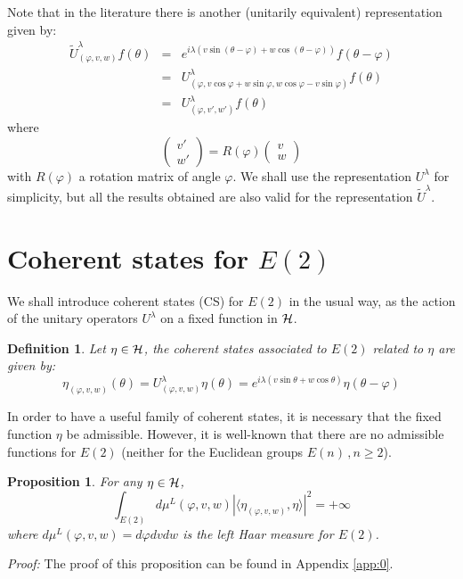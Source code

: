 \documentclass[11pt]{article}
\newtheorem{definition}{Definition}[section]
\newtheorem{proposition}{Proposition}[section]
\begin{document}
 Note that in the literature there is another (unitarily equivalent) representation given by:
 \begin{eqnarray}
  \tilde U_{(\varphi,v,w)}^\lambda f(\theta) &=& e^{i \lambda(v\sin(\theta-\varphi) + w\cos(\theta-\varphi))}f(\theta-\varphi)\nonumber \\ &=& U^\lambda_{(\varphi,v\cos\varphi+w\sin\varphi,w\cos\varphi-v\sin\varphi)}f(\theta)   \\
  &=& U^\lambda_{(\varphi,v',w')} f(\theta) \nonumber
 \end{eqnarray}
 where 
 \begin{equation}
  \left(\begin{array}{l}
         v'\\
         w'
        \end{array}\right)= R(\varphi) \left(\begin{array}{l}
         v\\
         w
        \end{array}\right)
\end{equation}
%
with $R(\varphi)$ a rotation matrix of angle $\varphi$.  We shall use the representation $U^\lambda$ for simplicity, but all the results obtained are also valid for the representation  $\tilde U^\lambda$.

\section{Coherent states for $E(2)$}

We shall introduce coherent states (CS) for $E(2)$ in the usual way, as the action of the unitary operators $U^\lambda$ on a fixed function in ${\cal H}$.


\begin{definition}
Let $ \eta\in {\cal H}$, the coherent states associated to $E(2)$ related to $ \eta$ are given by:
\begin{equation}
\eta_{(\varphi,v,w)}(\theta)=  U^\lambda_{(\varphi,v,w)} \eta(\theta)= e^{ i \lambda(v\sin\theta + w\cos\theta)}\eta(\theta-\varphi) \label{CSE2}
\end{equation}

\end{definition}

In order to have a useful family of coherent states, it is necessary that the fixed function $\eta$ be admissible. However, it is well-known \cite{Isham91}  that there are no admissible functions for $E(2)$ (neither for the Euclidean groups $E(n)\,,n\geq 2$).
%
\begin{proposition} \label{NonAdmissible}
 For any $ \eta\in {\cal H}$,
 \begin{equation}
  \int_{E(2)}d\mu^L(\varphi,v,w) |\langle \eta_{(\varphi,v,w)},\eta\rangle|^2=+\infty
 \end{equation}
 where $d\mu^L(\varphi,v,w)=d\varphi dvdw$ is the left Haar measure for $E(2)$.

\end{proposition}
%
\textit{Proof:} The proof of this proposition can be found in Appendix \ref{app:0}.
\end{document}
